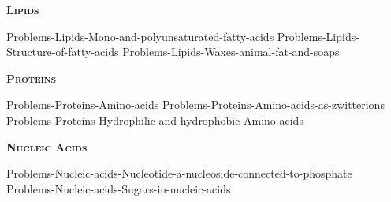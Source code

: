 \documentclass[main.tex]{subfiles}
\newcommand\chapterlabel{Ch-biochemistry}
\begin{document}
\begin{multicols*}{2}
{\raggedright\textsc{\textbf{Lipids}}\par}


 {Problems-Lipids-Mono-and-polyunsaturated-fatty-acids}
 {Problems-Lipids-Structure-of-fatty-acids}
 {Problems-Lipids-Waxes-animal-fat-and-soaps}


 





{\raggedright\textsc{\textbf{Proteins}}\par}




  {Problems-Proteins-Amino-acids}
 {Problems-Proteins-Amino-acids-as-zwitterions}
 {Problems-Proteins-Hydrophilic-and-hydrophobic-Amino-acids}





 

 

{\raggedright\textsc{\textbf{Nucleic Acids}}\par}


 {Problems-Nucleic-acids-Nucleotide-a-nucleoside-connected-to-phosphate}
 {Problems-Nucleic-acids-Sugars-in-nucleic-acids}
 
 


\end{multicols*} \iftoggle{showfinalanswers}{
\newpage\fancyhfoffset[E,O]{0pt}
\begin{answerbox}
\begin{answersenvironment}
 \begin{localsize}{10}
{ \checkoddpage\ifoddpage    \else   \clearpage\thispagestyle{empty}\mbox{}\clearpage\fi
\Large \bf Answers}
\SetupExSheets{ headings = inline-nr , counter-format = qu) ,}
\printsolutions 
  \vspace{20cm}
\newpage
The end
 \end{localsize}
 \end{answersenvironment}
\end{answerbox}
}{}
\checkoddpage\ifoddpage   \clearpage\thispagestyle{empty}\mbox{}\clearpage \else   \fi
\end{document}
